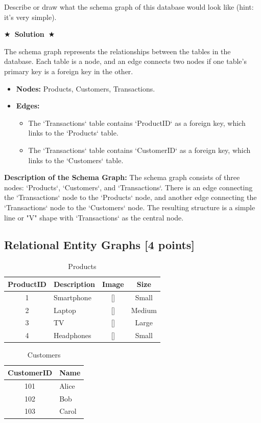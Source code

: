 \documentclass{article}
\numberwithin{figure}{section}
\newcommand{\Solution}[1]{%
    {%
        \medskip
        \color{red}
        \bf $\bigstar$~\sf\textbf{Solution}~$\bigstar$ \sf
        #1
    }
    \bigskip
}
\begin{document}
Describe or draw what the schema graph of this database would look like (hint: it’s very simple).

\Solution{
	The schema graph represents the relationships between the tables in the database. Each table is a node, and an edge connects two nodes if one table's primary key is a foreign key in the other.
	
	\begin{itemize}
		\item \textbf{Nodes:} Products, Customers, Transactions.
		\item \textbf{Edges:}
		\begin{itemize}
			\item The `Transactions` table contains `ProductID` as a foreign key, which links to the `Products` table.
			\item The `Transactions` table contains `CustomerID` as a foreign key, which links to the `Customers` table.
		\end{itemize}
	\end{itemize}
	
	\textbf{Description of the Schema Graph:}
	The schema graph consists of three nodes: `Products`, `Customers`, and `Transactions`. There is an edge connecting the `Transactions` node to the `Products` node, and another edge connecting the `Transactions` node to the `Customers` node. The resulting structure is a simple line or "V" shape with `Transactions` as the central node.
}

\subsection{Relational Entity Graphs [4 points]}
\begin{table}[H]
\centering
\caption{Products}
\begin{tabular}{|c|l|c|c|}
\hline
\textbf{ProductID} & \textbf{Description} & \textbf{Image} & \textbf{Size} \\
\hline
1 & Smartphone & [] & Small \\
2 & Laptop & [] & Medium \\
3 & TV & [] & Large \\
4 & Headphones & [] & Small \\
\hline
\end{tabular}
\end{table}

\begin{table}[H]
\centering
\caption{Customers}
\begin{tabular}{|c|l|}
\hline
\textbf{CustomerID} & \textbf{Name} \\
\hline
101 & Alice \\
102 & Bob \\
103 & Carol \\
\hline
\end{tabular}
\end{table}
\end{document}
